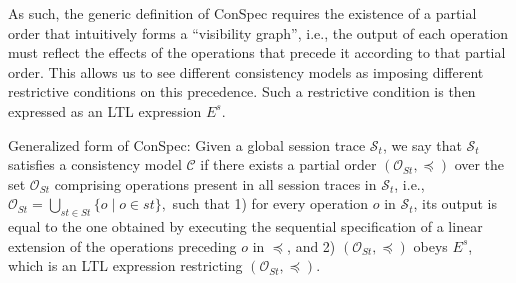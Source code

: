 \documentclass[journal,compsoc]{IEEEtran}
\begin{document}
As such, the generic definition of ConSpec requires the existence of a partial order that intuitively forms a ``visibility graph'', i.e., the output of each operation must reflect the effects of the operations that precede it according to that partial order. This allows us to see different consistency models as imposing different restrictive conditions on this precedence.
 Such a
  restrictive condition is then expressed as an LTL expression $E^s$. 
 \begin{definition}{Generalized form of ConSpec:}\label{def:form0}
Given a global session trace $\mathcal{S}_t$,
we say  that $\mathcal{S}_t$ satisfies a consistency model $\mathcal{C}$
if there exists a partial order $\left( {\mathcal{O}_{St}}, \preccurlyeq \right)$ over the set ${\mathcal{O}_{St}}$ comprising operations  present in all session traces in $\mathcal{S}_t$, i.e.,  ${\mathcal{O}_{St}} = \bigcup_{st \in St} \{ o \mid o \in st \},$  
 such that 1) for every operation $\mathit{o}$ in $\mathcal{S}_t$, its output is equal to the one obtained by executing the sequential specification of a linear extension of the operations preceding $\mathit{o}$ in $\preccurlyeq$,
 and 2) $\left( {\mathcal{O}_{St}}, \preccurlyeq \right)$ obeys $E^s$, which is an LTL expression restricting $\left( {\mathcal{O}_{St}}, \preccurlyeq \right)$.
\end{definition}

\end{document}
